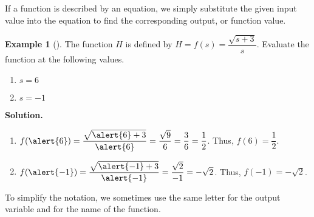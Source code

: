\documentclass[10pt,]{book}
\theoremstyle{plain}
\theoremstyle{definition}
\theoremstyle{definition}
\theoremstyle{definition}
\newtheorem{example}[theorem]{Example}
\theoremstyle{definition}
\numberwithin{equation}{section}
\begin{document}
\hypertarget{p-59}{}%
If a function is described by an equation, we simply substitute the given input value into the equation to find the corresponding output, or function value.%
\begin{example}[]\label{example-evaluate-function}
\hypertarget{p-60}{}%
The function \(H\) is defined by \(H=f(s) = \dfrac{\sqrt{s+3}}{s}\). Evaluate the function at the following values. \leavevmode%
\begin{enumerate}[label=\alph*]
\item\hypertarget{li-14}{}\hypertarget{p-61}{}%
\(s=6\)%
\item\hypertarget{li-15}{}\hypertarget{p-62}{}%
\(s=-1\)%
\end{enumerate}
%
\par\smallskip%
\noindent\textbf{Solution.}\hypertarget{solution-3}{}\quad%
\hypertarget{p-63}{}%
\leavevmode%
\begin{enumerate}[label=\alph*]
\item\hypertarget{li-16}{}\hypertarget{p-64}{}%
\(f(\alert{6})=\dfrac{\sqrt{\alert{6}+3}}{\alert{6}}=
\dfrac{\sqrt{9}}{6}=\dfrac{3}{6}=\dfrac{1}{2}\). Thus, \(f(6)=\dfrac{1}{2}\).%
\item\hypertarget{li-17}{}\hypertarget{p-65}{}%
\(f(\alert{-1})=\dfrac{\sqrt{\alert{-1}+3}}{\alert{-1}}=
\dfrac{\sqrt{2}}{-1}=-\sqrt{2}\). Thus, \(f(-1)=-\sqrt{2}\).%
\end{enumerate}
%
\end{example}
\hypertarget{p-66}{}%
To simplify the notation, we sometimes use the same letter for the output variable and for the name of the function.%
\typeout{************************************************}
\typeout{************************************************}
\end{document}
